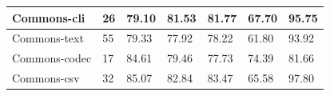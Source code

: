 \documentclass[conference,draftclsnofoot,onecolumn]{IEEEtran}
\begin{document}
\begin{table}[ht]
\begin{tabular}{|l|l|l|l|l|l|l|}
Commons-cli           & 26                                                                                               & 79.10                                                                                                                           & 81.53                                                                                                                                  & 81.77                                                                                      & 67.70                                                                                        & 95.75                                                                                       \\ \hline
Commons-text          & 55                                                                                               & 79.33                                                                                                                           & 77.92                                                                                                                                  & 78.22                                                                                      & 61.80                                                                                        & 93.92                                                                                       \\ \hline
Commons-codec         & 17                                                                                               & 84.61                                                                                                                           & 79.46                                                                                                                                  & 77.73                                                                                      & 74.39                                                                                        & 81.66                                                                                       \\ \hline
Commons-csv           & 32                                                                                               & 85.07                                                                                                                           & 82.84                                                                                                                                  & 83.47                                                                                      & 65.58                                                                                        & 97.80                                                                                       \\ \hline

\end{tabular}
\end{table}
\end{document}
